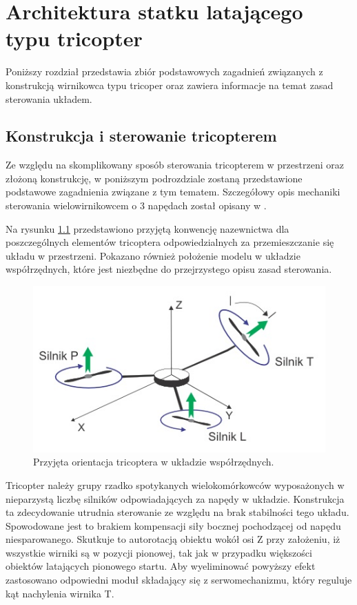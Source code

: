 \chapter{Architektura statku latającego typu tricopter}
\label{cha:architektura_statku_latajacego_typu_tricopter}

Poniższy rozdział przedstawia zbiór podstawowych zagadnień związanych z konstrukcją wirnikowca typu tricoper oraz zawiera informacje na temat zasad sterowania układem.

\section{Konstrukcja i sterowanie tricopterem}

Ze względu na skomplikowany sposób sterowania tricopterem w przestrzeni oraz złożoną konstrukcję, w poniższym podrozdziale zostaną przedstawione podstawowe zagadnienia związane z tym tematem. Szczegółowy opis mechaniki sterowania wielowirnikowcem o 3 napędach został opisany w \cite{Dong-Wan}.

Na rysunku \ref{fig:orientation} przedstawiono przyjętą konwencję nazewnictwa dla poszczególnych elementów tricoptera odpowiedzialnych za przemieszczanie się układu w przestrzeni. Pokazano również położenie modelu w układzie współrzędnych, które jest niezbędne do przejrzystego opisu zasad sterowania.

\begin{figure}[!htbp]
\centering
\includegraphics[width=0.7\linewidth]{./include/orientation}
\caption{Przyjęta orientacja tricoptera w układzie współrzędnych.}
\label{fig:orientation}
\end{figure}

Tricopter należy grupy rzadko spotykanych wielokomórkowców wyposażonych w nieparzystą liczbę silników odpowiadających za napędy w układzie.
Konstrukcja ta zdecydowanie utrudnia sterowanie ze względu na brak stabilności tego układu. Spowodowane jest to brakiem kompensacji siły bocznej pochodzącej od napędu niesparowanego. Skutkuje to autorotacją obiektu wokół osi Z przy założeniu, iż wszystkie wirniki są w pozycji pionowej, tak jak w przypadku większości obiektów latających pionowego startu. Aby wyeliminować powyższy efekt zastosowano odpowiedni moduł składający się z serwomechanizmu, który reguluje kąt nachylenia wirnika T.


